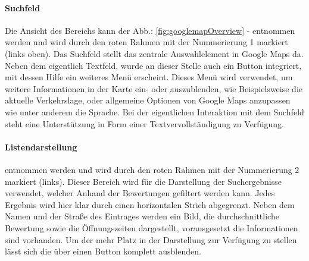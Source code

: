 \documentclass[../Bachelorarbeit.tex]{subfiles}
\begin{document}
\paragraph{Suchfeld}
\label{gmapsSearch}
Die Ansicht des Bereichs  kann der Abb.: \ref{fig:googlemapOverview} -  entnommen werden und wird durch den roten Rahmen mit der Nummerierung 1 markiert (links oben).
Das Suchfeld stellt das zentrale Auswahlelement in Google Maps da. 
Neben dem eigentlich Textfeld, wurde an dieser Stelle auch ein Button integriert, mit dessen Hilfe ein weiteres Menü erscheint. 
Dieses Menü wird verwendet, um weitere Informationen  in der Karte ein- oder auszublenden, wie Beispielsweise die aktuelle Verkehrslage, oder allgemeine Optionen von Google Maps anzupassen wie unter anderem die Sprache.
Bei der eigentlichen Interaktion mit dem Suchfeld steht eine Unterstützung in Form einer Textvervollständigung zu Verfügung. 

\paragraph{Listendarstellung}
\label{gmapsList}
 entnommen werden und wird durch den roten Rahmen mit der Nummerierung 2 markiert (links).
Dieser Bereich wird für die Darstellung der Suchergebnisse verwendet, welcher Anhand der Bewertungen gefiltert werden kann.
Jedes Ergebnis wird hier klar durch einen horizontalen Strich abgegrenzt.
Neben dem Namen und der Straße des Eintrages werden ein Bild, die durchschnittliche Bewertung sowie die Öffnungszeiten dargestellt, vorausgesetzt die Informationen sind vorhanden.
Um der  mehr Platz in der Darstellung zur Verfügung zu stellen lässt sich die  über einen Button komplett ausblenden. 
\end{document}
